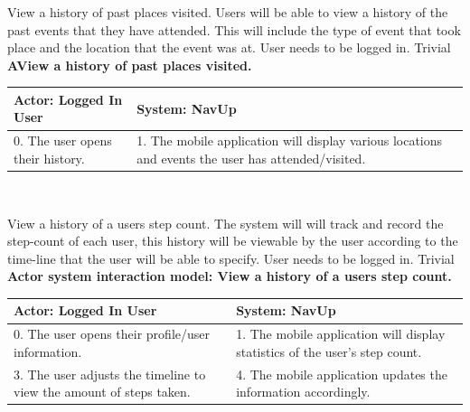 \FuncReq
{View a history of past places visited.}
{Users will be able to view a history of the past events that they have attended. This will include the type of event that took place and the location that the event was at.}
{User needs to be logged in.}
{Trivial}
\\
    \textbf{AView a history of past places visited. }\\
    \begin{tabular}{ | p{6cm} | p{6cm} |}
    \hline
    Actor: Logged In User & System: NavUp \\ \hline
    0. The user opens their history. & 1. The mobile application will display various locations and events the user has attended/visited.\\ \hline
    \end{tabular}
\\
\bigskip

\FuncReq
{View a history of a users step count.}
{The system will will track and record the step-count of each user, this history will be viewable by the user according to the time-line that the user will be able to specify.}
{User needs to be logged in.}
{Trivial}
\\
    \textbf{Actor system interaction model: View a history of a users step count. }\\
    \begin{tabular}{ | p{6cm} | p{6cm} |}
    \hline
    Actor: Logged In User & System: NavUp \\ \hline
    0. The user opens their profile/user information. & 1. The mobile application will display statistics of the user's step count.\\ \hline
    3. The user adjusts the timeline to view the amount of steps taken. & 4. The mobile application updates the information accordingly. \\ \hline
    \end{tabular}
\\
\bigskip
